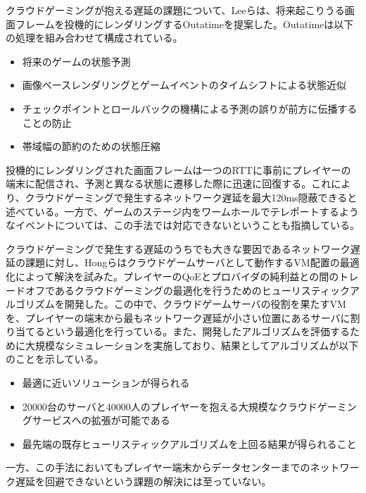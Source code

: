 クラウドゲーミングが抱える遅延の課題について、Leeら\cite{outatime}は、将来起こりうる画面フレームを投機的にレンダリングするOutatimeを提案した。Outatimeは以下の処理を組み合わせて構成されている。
\begin{itemize}
    \item 将来のゲームの状態予測
    \item 画像ベースレンダリングとゲームイベントのタイムシフトによる状態近似
    \item チェックポイントとロールバックの機構による予測の誤りが前方に伝播することの防止
    \item 帯域幅の節約のための状態圧縮
\end{itemize}
投機的にレンダリングされた画面フレームは一つのRTTに事前にプレイヤーの端末に配信され、予測と異なる状態に遷移した際に迅速に回復する。これにより、クラウドゲーミングで発生するネットワーク遅延を最大120ms隠蔽できると述べている。一方で、ゲームのステージ内をワームホールでテレポートするようなイベントについては、この手法では対応できないということも指摘している。

クラウドゲーミングで発生する遅延のうちでも大きな要因であるネットワーク遅延の課題に対し、Hongら\cite{placing}はクラウドゲームサーバとして動作するVM配置の最適化によって解決を試みた。プレイヤーのQoEとプロバイダの純利益との間のトレードオフであるクラウドゲーミングの最適化を行うためのヒューリスティックアルゴリズムを開発した。この中で、クラウドゲームサーバの役割を果たすVMを、プレイヤーの端末から最もネットワーク遅延が小さい位置にあるサーバに割り当てるという最適化を行っている。また、開発したアルゴリズムを評価するために大規模なシミュレーションを実施しており、結果としてアルゴリズムが以下のことを示している。
\begin{itemize}
    \item 最適に近いソリューションが得られる
    \item 20000台のサーバと40000人のプレイヤーを抱える大規模なクラウドゲーミングサービスへの拡張が可能である
    \item 最先端の既存ヒューリスティックアルゴリズムを上回る結果が得られること
\end{itemize}
一方、この手法においてもプレイヤー端末からデータセンターまでのネットワーク遅延を回避できないという課題の解決には至っていない。



